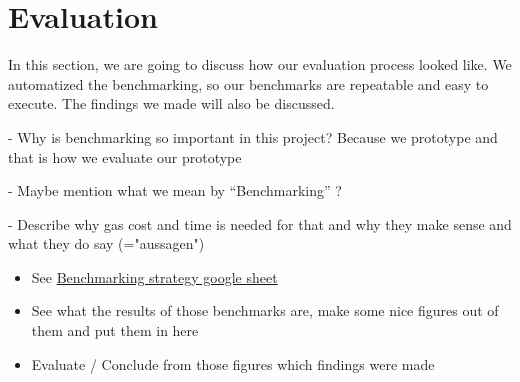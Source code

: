 \section{Evaluation}
In this section, we are going to discuss how our evaluation process looked like. We automatized the benchmarking, so our benchmarks are repeatable and easy to execute. The findings we made will also be discussed.

- Why is benchmarking so important in this project? Because we prototype and that is how we evaluate our prototype

- Maybe mention what we mean by ``Benchmarking'' ?

- Describe why gas cost and time is needed for that and why they make sense and what they do say (="aussagen")

\begin{itemize}
\item See \href{https://drive.google.com/drive/folders/1KhEb6TT2YXKUlSJx2sdfR44ZhWUSHnXN}{Benchmarking strategy google sheet}
\item See what the results of those benchmarks are, make some nice figures out of them and put them in here
\item Evaluate / Conclude from those figures which findings were made
\end{itemize}


